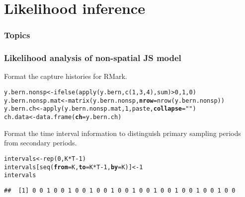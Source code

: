 \documentclass[color=usenames,dvipsnames]{beamer}\usepackage[]{graphicx}\usepackage[]{xcolor}
\makeatletter
\newcommand{\hlnum}[1]{\textcolor[rgb]{0.69,0.494,0}{#1}}%
\newcommand{\hlsng}[1]{\textcolor[rgb]{0.749,0.012,0.012}{#1}}%
\newcommand{\hlopt}[1]{\textcolor[rgb]{0,0,0}{#1}}%
\newcommand{\hldef}[1]{\textcolor[rgb]{0,0,0}{#1}}%
\newcommand{\hlkwb}[1]{\textcolor[rgb]{0,0.341,0.682}{#1}}%
\newcommand{\hlkwc}[1]{\textcolor[rgb]{0,0,0}{\textbf{#1}}}%
\newcommand{\hlkwd}[1]{\textcolor[rgb]{0.004,0.004,0.506}{#1}}%
\newenvironment{kframe}{%
 \def\at@end@of@kframe{}%
 \ifinner\ifhmode%
  \def\at@end@of@kframe{\end{minipage}}%
  \begin{minipage}{\columnwidth}%
 \fi\fi%
 \def\FrameCommand##1{\hskip\@totalleftmargin \hskip-\fboxsep
 \colorbox{shadecolor}{##1}\hskip-\fboxsep
     \hskip-\linewidth \hskip-\@totalleftmargin \hskip\columnwidth}%
 \MakeFramed {\advance\hsize-\width
   \@totalleftmargin\z@ \linewidth\hsize
   \@setminipage}}%
 {\par\unskip\endMakeFramed%
 \at@end@of@kframe}
\newenvironment{knitrout}{}{} %
\makeatother
\begin{document}
\section{Likelihood inference}



\begin{frame}[plain]
  \frametitle{Topics}
  \Large
  \tableofcontents[currentsection]
\end{frame}


\begin{frame}[fragile]
  \frametitle{Likelihood analysis of non-spatial JS model}
  Format the capture histories for RMark.
\begin{knitrout}\scriptsize
{}\color{fgcolor}\begin{kframe}
\begin{alltt}
\hldef{y.bern.nonsp} \hlkwb{<-} \hlkwd{ifelse}\hldef{(}\hlkwd{apply}\hldef{(y.bern,} \hlkwd{c}\hldef{(}\hlnum{1}\hldef{,}\hlnum{3}\hldef{,}\hlnum{4}\hldef{), sum)}\hlopt{>}\hlnum{0}\hldef{,} \hlnum{1}\hldef{,} \hlnum{0}\hldef{)}
\hldef{y.bern.nonsp.mat} \hlkwb{<-} \hlkwd{matrix}\hldef{(y.bern.nonsp,} \hlkwc{nrow}\hldef{=}\hlkwd{nrow}\hldef{(y.bern.nonsp))}
\hldef{y.bern.ch} \hlkwb{<-} \hlkwd{apply}\hldef{(y.bern.nonsp.mat,} \hlnum{1}\hldef{, paste,} \hlkwc{collapse}\hldef{=}\hlsng{""}\hldef{)}
\hldef{ch.data} \hlkwb{<-} \hlkwd{data.frame}\hldef{(}\hlkwc{ch}\hldef{=y.bern.ch)}
\end{alltt}
\end{kframe}
\end{knitrout}
  \pause
  \vfill
  Format the time interval information to distinguish primary sampling periods from secondary periods. 
\begin{knitrout}\scriptsize
{}\color{fgcolor}\begin{kframe}
\begin{alltt}
\hldef{intervals} \hlkwb{<-} \hlkwd{rep}\hldef{(}\hlnum{0}\hldef{, K}\hlopt{*}\hldef{T}\hlopt{-}\hlnum{1}\hldef{)}
\hldef{intervals[}\hlkwd{seq}\hldef{(}\hlkwc{from}\hldef{=K,} \hlkwc{to}\hldef{=K}\hlopt{*}\hldef{T}\hlopt{-}\hlnum{1}\hldef{,} \hlkwc{by}\hldef{=K)]} \hlkwb{<-} \hlnum{1}
\hldef{intervals}
\end{alltt}
\begin{verbatim}
##  [1] 0 0 1 0 0 1 0 0 1 0 0 1 0 0 1 0 0 1 0 0 1 0 0 1 0 0 1 0 0
\end{verbatim}
\end{kframe}
\end{knitrout}

\end{frame}
\end{document}
